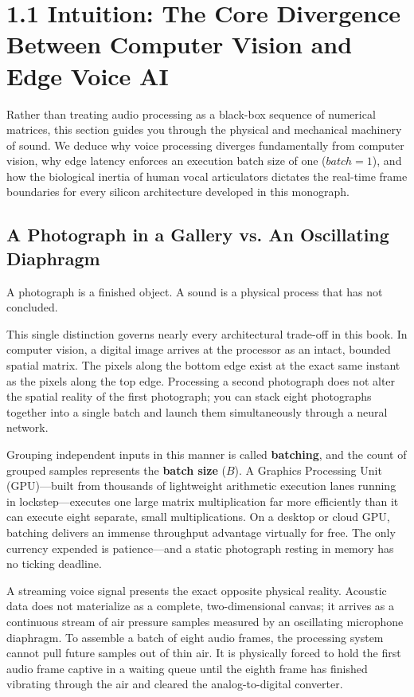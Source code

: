\documentclass[11pt,a4paper]{article}
\begin{document}
\section*{1.1 Intuition: The Core Divergence Between Computer Vision and Edge Voice AI}

\begin{learningobj}
Rather than treating audio processing as a black-box sequence of numerical matrices, this section guides you through the physical and mechanical machinery of sound. We deduce why voice processing diverges fundamentally from computer vision, why edge latency enforces an execution batch size of one ($batch=1$), and how the biological inertia of human vocal articulators dictates the real-time frame boundaries for every silicon architecture developed in this monograph.
\end{learningobj}

\subsection*{A Photograph in a Gallery vs. An Oscillating Diaphragm}

A photograph is a finished object. A sound is a physical process that has not concluded.

This single distinction governs nearly every architectural trade-off in this book. In computer vision, a digital image arrives at the processor as an intact, bounded spatial matrix. The pixels along the bottom edge exist at the exact same instant as the pixels along the top edge. Processing a second photograph does not alter the spatial reality of the first photograph; you can stack eight photographs together into a single batch and launch them simultaneously through a neural network.

Grouping independent inputs in this manner is called \textbf{batching}, and the count of grouped samples represents the \textbf{batch size} ($B$). A Graphics Processing Unit (GPU)---built from thousands of lightweight arithmetic execution lanes running in lockstep---executes one large matrix multiplication far more efficiently than it can execute eight separate, small multiplications. On a desktop or cloud GPU, batching delivers an immense throughput advantage virtually for free. The only currency expended is patience---and a static photograph resting in memory has no ticking deadline.

A streaming voice signal presents the exact opposite physical reality. Acoustic data does not materialize as a complete, two-dimensional canvas; it arrives as a continuous stream of air pressure samples measured by an oscillating microphone diaphragm. To assemble a batch of eight audio frames, the processing system cannot pull future samples out of thin air. It is physically forced to hold the first audio frame captive in a waiting queue until the eighth frame has finished vibrating through the air and cleared the analog-to-digital converter.
\end{document}
